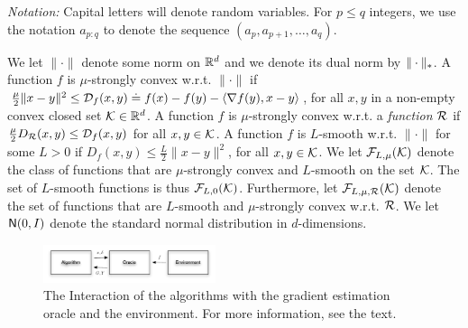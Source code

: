 
\textit{Notation:} Capital letters will denote random variables.
For $p\le q$ integers, 
 we use the notation $a_{p:q}$ to denote
 the sequence $(a_p,a_{p+1}, \dots, a_{q})$.

 We let $\| \cdot \|$ denote some norm on $\mathbb{R}^d$ and we denote its dual norm by $\|\cdot\|_*$.
 A function $f$ is $\mu$-strongly convex w.r.t. $\| \cdot \|$  if 
 $\tfrac{\mu}{2} \|x-y\|^2 \le \mathcal{D}_f(x,y)\doteq f(x)-f(y)-\langle \nabla f(y),x-y \rangle$, for all $x,y$ in a non-empty convex closed set $\mathcal{K} \in \mathbb{R}^d$. 
A function $f$ is $\mu$-strongly convex w.r.t. a \emph{function} $\mathcal{R}$ 
	if $\tfrac{\mu}{2}D_{\mathcal{R}}(x,y)\le\mathcal{D}_f(x,y)$ for all $x,y \in \mathcal{K}$.
 A function $f$ is $L$-smooth w.r.t. $\| \cdot \|$ for some $L>0$ if 
$ D_f(x,y) \le \tfrac{L}{2} \|x-y\|^2$, for all $x,y \in \mathcal{K}$.
 We let $\mathcal{F}_{L,\mu}(\mathcal{K})$ denote the class of functions that are $\mu$-strongly convex and $L$-smooth on the set $\mathcal{K}$. 
 The set of $L$-smooth functions is thus $\mathcal{F}_{L,0}(\mathcal{K})$. Furthermore, let $\mathcal{F}_{L,\mu,\mathcal{R}}(\mathcal{K})$ denote the set of functions that are  $L$-smooth and $\mu$-strongly convex w.r.t. $\mathcal{R}$.
 We let $\mathsf{N}(0, I)$ denote the standard normal distribution in $d$-dimensions.

\begin{figure}
\begin{center}
\includegraphics[width=0.45\textwidth]{figs/oracle}
\end{center}
\caption{The Interaction of the algorithms with the gradient estimation oracle and the environment. For more information, see the text.}
\label{fig:oracle}
\end{figure}

